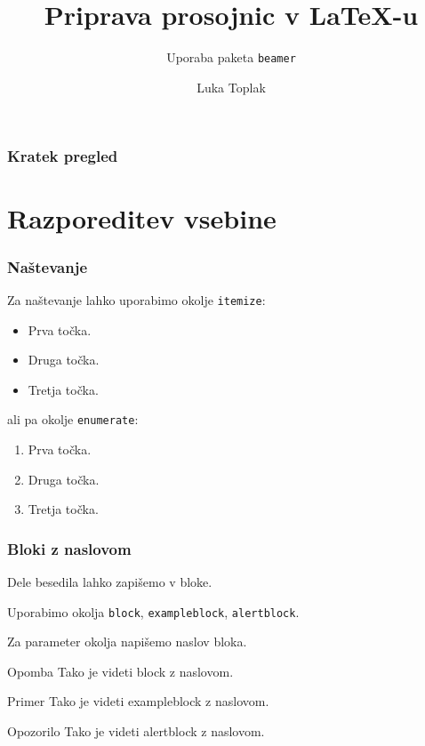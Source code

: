 \documentclass[11pt,hyperref={unicode}]{beamer}
\title{Priprava prosojnic v LaTeX-u}
\subtitle{Uporaba paketa \texttt{beamer}}
\author{Luka Toplak}
\institute[FMF]{FMF Fakulteta za matematiko in fiziko}
\date{}
\begin{document}
\frame{\titlepage}

\begin{frame}
   \frametitle{Kratek pregled}
   \tableofcontents[pausesections]
\end{frame}
\section{Razporeditev vsebine}
\begin{frame}
   \frametitle{Naštevanje}
   
   Za naštevanje lahko uporabimo okolje \texttt{itemize}:
   \begin{itemize} 
      \item Prva točka.
      \item Druga točka.
      \item Tretja točka.
   \end{itemize}
   ali pa okolje \texttt{enumerate}:
   \begin{enumerate}
      \item Prva točka.
      \item Druga točka.
      \item Tretja točka.
   \end{enumerate}
\end{frame}
\begin{frame}
   \frametitle{Bloki z naslovom}
   Dele besedila lahko zapišemo v bloke.

   Uporabimo okolja \texttt{block}, \texttt{exampleblock}, \texttt{alertblock}.

   Za parameter okolja napišemo naslov bloka.

   \begin{block}{Opomba}
      Tako je videti block z naslovom.
   \end{block}
   
   \begin{exampleblock}{Primer}
      Tako je videti exampleblock z naslovom.
   \end{exampleblock}

   \begin{alertblock}{Opozorilo}
   Tako je videti alertblock z naslovom.
   \end{alertblock}
\end{frame}
\end{document}
